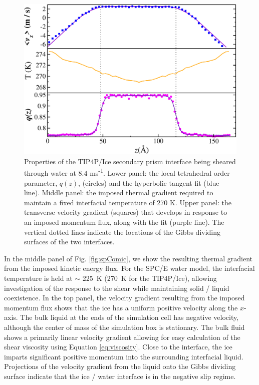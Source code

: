 \begin{figure}
\includegraphics[width=\linewidth]{Figures/SecPrism_TIP4PIce_Plot}
\caption{\label{fig:tipsComic} Properties of the TIP4P/Ice secondary prism
  interface being sheared through water at 8.4
  ms\textsuperscript{-1}. Lower panel: the local tetrahedral order
  parameter, $q(z)$, (circles) and the hyperbolic tangent fit
  (blue line).  Middle panel: the imposed thermal gradient
  required to maintain a fixed interfacial temperature of 270 K. Upper
  panel: the transverse velocity gradient (squares) that develops in
  response to an imposed momentum flux, along with the fit (purple
  line). The vertical dotted lines indicate the locations of the Gibbs
  dividing surfaces of the two interfaces.}
\end{figure}

In the middle panel of Fig. \ref{fig:spComic}, we show the resulting
thermal gradient from the imposed kinetic energy flux. For the SPC/E
water model, the interfacial temperature is held at $\sim$ 225~K
(270~K for the TIP4P/Ice), allowing investigation of the response to
the shear while maintaining solid / liquid coexistence. In the top
panel, the velocity gradient resulting from the imposed momentum flux
shows that the ice has a uniform positive velocity along the
$x$-axis. The bulk liquid at the ends of the simulation cell has
negative velocity, although the center of mass of the simulation box
is stationary.  The bulk fluid shows a primarily linear velocity
gradient allowing for easy calculation of the shear viscosity using
Equation \eqref{eq:viscosity}. Close to the interface, the ice imparts
significant positive momentum into the surrounding interfacial liquid.
Projections of the velocity gradient from the liquid onto the Gibbs
dividing surface indicate that the ice / water interface is in the
negative slip regime. 


